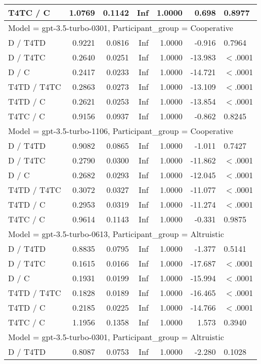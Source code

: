 \begin{table}[ht]
\begin{tabular}{lrrrrrl}
  T4TC / C & 1.0769 & 0.1142 & Inf & 1.0000 & 0.698 & 0.8977 \\ 
   \hline
\multicolumn{7}{l}{Model = gpt-3.5-turbo-0301, Participant_group = Cooperative}\\
D / T4TD & 0.9221 & 0.0816 & Inf & 1.0000 & -0.916 & 0.7964 \\ 
  D / T4TC & 0.2640 & 0.0251 & Inf & 1.0000 & -13.983 & $<$.0001 \\ 
  D / C & 0.2417 & 0.0233 & Inf & 1.0000 & -14.721 & $<$.0001 \\ 
  T4TD / T4TC & 0.2863 & 0.0273 & Inf & 1.0000 & -13.109 & $<$.0001 \\ 
  T4TD / C & 0.2621 & 0.0253 & Inf & 1.0000 & -13.854 & $<$.0001 \\ 
  T4TC / C & 0.9156 & 0.0937 & Inf & 1.0000 & -0.862 & 0.8245 \\ 
   \hline
\multicolumn{7}{l}{Model = gpt-3.5-turbo-1106, Participant_group = Cooperative}\\
D / T4TD & 0.9082 & 0.0865 & Inf & 1.0000 & -1.011 & 0.7427 \\ 
  D / T4TC & 0.2790 & 0.0300 & Inf & 1.0000 & -11.862 & $<$.0001 \\ 
  D / C & 0.2682 & 0.0293 & Inf & 1.0000 & -12.045 & $<$.0001 \\ 
  T4TD / T4TC & 0.3072 & 0.0327 & Inf & 1.0000 & -11.077 & $<$.0001 \\ 
  T4TD / C & 0.2953 & 0.0319 & Inf & 1.0000 & -11.274 & $<$.0001 \\ 
  T4TC / C & 0.9614 & 0.1143 & Inf & 1.0000 & -0.331 & 0.9875 \\ 
   \hline
\multicolumn{7}{l}{Model = gpt-3.5-turbo-0613, Participant_group = Altruistic}\\
D / T4TD & 0.8835 & 0.0795 & Inf & 1.0000 & -1.377 & 0.5141 \\ 
  D / T4TC & 0.1615 & 0.0166 & Inf & 1.0000 & -17.687 & $<$.0001 \\ 
  D / C & 0.1931 & 0.0199 & Inf & 1.0000 & -15.994 & $<$.0001 \\ 
  T4TD / T4TC & 0.1828 & 0.0189 & Inf & 1.0000 & -16.465 & $<$.0001 \\ 
  T4TD / C & 0.2185 & 0.0225 & Inf & 1.0000 & -14.766 & $<$.0001 \\ 
  T4TC / C & 1.1956 & 0.1358 & Inf & 1.0000 & 1.573 & 0.3940 \\ 
   \hline
\multicolumn{7}{l}{Model = gpt-3.5-turbo-0301, Participant_group = Altruistic}\\
D / T4TD & 0.8087 & 0.0753 & Inf & 1.0000 & -2.280 & 0.1028 \\ 

\end{tabular}
\end{table}
